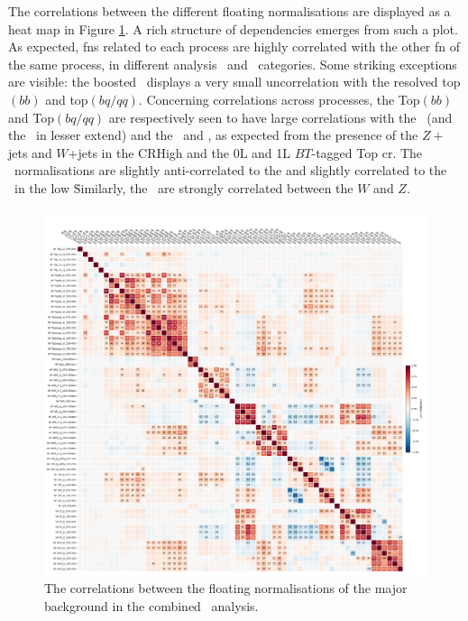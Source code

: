 The correlations between the different floating normalisations are displayed as a heat map in Figure \ref{fig:FNcorr}. A rich structure of dependencies emerges from such a plot. As expected, \glspl{fn} related to each process are highly correlated with the other \gls{fn} of the same process, in different analysis \ptv\ and \nj\ categories. Some striking exceptions are visible: the boosted \ttb\ displays a very small uncorrelation with the resolved top$(bb)$ and top$(bq/qq)$. Concerning correlations across processes, the Top$(bb)$ and Top$(bq/qq)$ are respectively seen to have large correlations with the \zhf\ (and the \whf\ in lesser extend) and the \wmf\ and \zmf, as expected from the presence of the $Z+$jets and $W$+jets in the CRHigh and the 0L and 1L $BT$-tagged Top \gls{cr}. The \whf\ normalisations are slightly anti-correlated to the \vlf and slightly correlated to the \zhf\ in the low \nj\. Similarly, the \vlf\ are strongly correlated between the $W$ and $Z$.
  
\begin{figure}[h!]
    \hspace{-1cm}
    \includegraphics[width=1.1\textwidth]{Images/VH/Fit/fromSlides/SMVHbbcc_2022_MVA_mc16ade_v14.fit_012_fullRes_VHbb_fit_012_012_mc16ade_Systs_mva_VHbbcc_AsimovFit_conditional_mu1_Cov_BTag}
    \caption{The correlations between the floating normalisations of the major background in the combined \vhbc\ analysis.}
    \label{fig:FNcorr}
\end{figure} 

